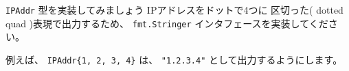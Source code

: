 \texttt{IPAddr} 型を実装してみましょう IPアドレスをドットで4つに
区切った( dotted quad )表現で出力するため、 \texttt{fmt.Stringer}
インタフェースを実装してください。

例えば、 \texttt{IPAddr\{1, 2, 3, 4\}} は、 \texttt{"1.2.3.4"} として出力するようにします。